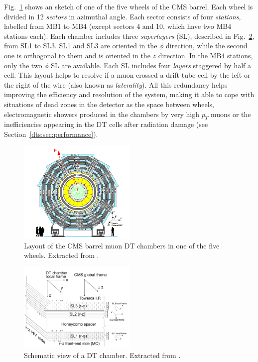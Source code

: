 \documentclass[../main.tex]{subfiles}
\begin{document}
Fig.~\ref{intro:fig:dtwheel} shows an sketch of one of the five wheels of the CMS barrel. Each wheel is divided in 12 \textit{sectors} in azimuthal angle. Each sector consists of four \textit{stations}, labelled from MB1 to MB4 (except sectors 4 and 10, which have two MB4 stations each). Each chamber includes three \textit{superlayers} (SL), described in Fig.~\ref{intro:fig:dtchamber}, from SL1 to SL3. SL1 and SL3 are oriented in the $\phi$ direction, while the second one is orthogonal to them and is oriented in the $z$ direction. In the MB4 stations, only the two $\phi$ SL are available. Each SL includes four \textit{layers} staggered by half a cell. This layout helps to resolve if a muon crossed a drift tube cell by the left or the right of the wire (also known as \textit{laterality}). All this redundancy helps improving the efficiency and resolution of the system, making it able to cope with situations of dead zones in the detector as the space between wheels, electromagnetic showers produced in the chambers by very high $p_T$ muons or the inefficiencies appearing in the DT cells after radiation damage (see Section~\ref{dts:sec:performance}).



\begin{figure}
\begin{center}
\includegraphics[width=0.5\textwidth]{Images/dtwheel.png}
\end{center}
\caption{Layout of the CMS barrel muon DT chambers in one of the five wheels. Extracted from \cite{intro:exp:cms}.}
\label{intro:fig:dtwheel}
\end{figure}

\begin{figure}
\begin{center}
\includegraphics[width=0.5\textwidth]{Images/DT_Chamber.png}
\end{center}
\caption{Schematic view of a DT chamber. Extracted from \cite{intro:exp:dt_calib}.}
\label{intro:fig:dtchamber}
\end{figure}
\end{document}
